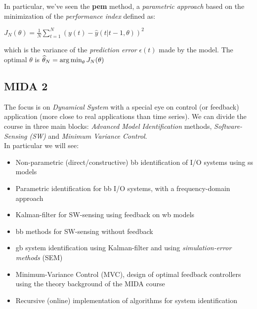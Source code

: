 In particular, we've seen the \textbf{\acrfull{pem}} method, a \emph{parametric approach} based on the minimization of the \emph{performance index} defined as:
\begin{defn}
    $J_{N}(\theta) = \frac{1}{N} \sum_{t=1}^N \left(y(t) - \hat{y}(t|t-1, \theta)\right)^2$
\end{defn}

which is the variance of the \emph{prediction error} $\epsilon(t)$ made by the model. The optimal $\theta$ is $\widehat{\theta}_N = \operatorname*{arg\,min}_\theta J_{N}(\theta)$

\subsection{MIDA 2}

The focus is on \emph{Dynamical System} with a special eye on control (or feedback) application (more close to real applications than time series). We can divide the course in three main blocks: \emph{Advanced Model Identification} methods, \emph{Software-Sensing (SW)} and \emph{Minimum Variance Control}.\\
In particular we will see: 

\begin{itemize}
    \item Non-parametric (direct/constructive) \gls{bb} identification of I/O systems using \acrlong{ss} models
    \item Parametric identification for \gls{bb} I/O systems, with a frequency-domain approach
    \item Kalman-filter for SW-sensing using feedback on \gls{wb} models
    \item \gls{bb} methods for SW-sensing without feedback
    \item \gls{gb} system identification using Kalman-filter and using \emph{simulation-error methods} (SEM)
    \item  Minimum-Variance Control (MVC), design of optimal feedback controllers using the theory background of the MIDA course
    \item Recursive (online) implementation of algorithms for system identification
\end{itemize}

